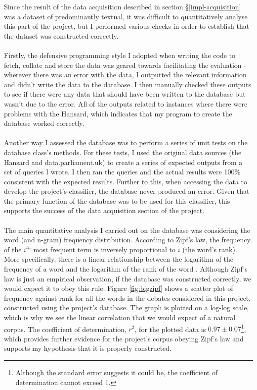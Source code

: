 \documentclass[12pt,a4paper,twoside,openright]{report}
\begin{document}
Since the result of the data acquisition described in section \S\ref{impl-acquisition} was a dataset of predominantly textual, it was difficult to quantitatively analyse this part of the project, but I performed various checks in order to establish that the dataset was constructed correctly.
\\\\
Firstly, the defensive programming style I adopted when writing the code to fetch, collate and store the data was geared towards facilitating the evaluation - wherever there was an error with the data, I outputted the relevant information and didn't write the data to the database. I then manually checked these outputs to see if there were any data that should have been written to the database but wasn't due to the error. All of the outputs related to instances where there were problems with the Hansard, which indicates that my program to create the database worked correctly.
\\\\
Another way I assessed the database was to perform a series of unit tests on the database class's methods. For these tests, I used the original data sources (the Hansard and data.parliament.uk) to create a series of expected outputs from a set of queries I wrote. I then ran the queries and the actual results were 100\% consistent with the expected results. Further to this, when accessing the data to develop the project's classifier, the database never produced an error. Given that the primary function of the database was to be used for this classifier, this supports the success of the data acquisition section of the project.
\\\\
The main quantitative analysis I carried out on the database was considering the word (and n-gram) frequency distribution. According to Zipf's law, the frequency of the $i^{th}$ most frequent term is inversely proportional to $i$ (the word's rank). More specifically, there is a linear relationship between the logarithm of the frequency of a word and the logarithm of the rank of the word \cite{zipf}. Although Zipf's law is just an empirical observation, if the database was constructed correctly, we would expect it to obey this rule. Figure \ref{fig:bigzipf} shows a scatter plot of frequency against rank for all the words in the debates considered in this project, constructed using the project's database. The graph is plotted on a log-log scale, which is why we see the linear correlation that we would expect of a natural corpus. The coefficient of determination, $r^2$, for the plotted data is $0.97 \pm 0.07$\footnote{Although the standard error suggests it could be, the coefficient of determination cannot exceed 1.}, which provides further evidence for the project's corpus obeying Zipf's law and supports my hypothesis that it is properly constructed. 
\end{document}
